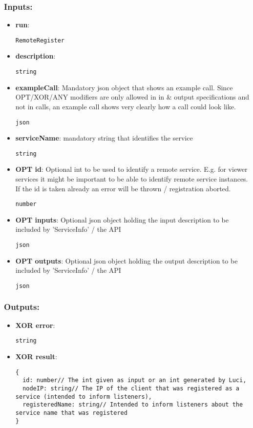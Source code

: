 \subsubsection*{Inputs:}
\begin{itemize}
    \item \textbf{run}: 
\begin{lstlisting}
RemoteRegister
\end{lstlisting}
    \item \textbf{description}: 
\begin{lstlisting}
string
\end{lstlisting}
    \item \textbf{exampleCall}: Mandatory json object that shows an example call. Since OPT/XOR/ANY  modifiers are only allowed in in \& output specifications and not in  calls, an example call shows very clearly how a call could look like.
\begin{lstlisting}
json
\end{lstlisting}
    \item \textbf{serviceName}: mandatory string that identifies the service
\begin{lstlisting}
string
\end{lstlisting}
    \item \textbf{OPT id}: Optional int to be used to identify a remote service. E.g. for  viewer services it might be important to be able to identify remote  service instances. If the id is taken already an error will be thrown /  registration aborted.
\begin{lstlisting}
number
\end{lstlisting}
    \item \textbf{OPT inputs}: Optional json object holding the input description to be included by 'ServiceInfo' / the API
\begin{lstlisting}
json
\end{lstlisting}
    \item \textbf{OPT outputs}: Optional json object holding the output description to be included by 'ServiceInfo' / the API
\begin{lstlisting}
json
\end{lstlisting}
  \end{itemize}

\subsubsection*{Outputs:}
\begin{itemize}
    \item \textbf{XOR error}: 
\begin{lstlisting}
string
\end{lstlisting}
    \item \textbf{XOR result}: 
\begin{lstlisting}
{
  id: number// The int given as input or an int generated by Luci, 
  nodeIP: string// The IP of the client that was registered as a service (intended to inform listeners), 
  registeredName: string// Intended to inform listeners about the service name that was registered
}
\end{lstlisting}
  \end{itemize}

